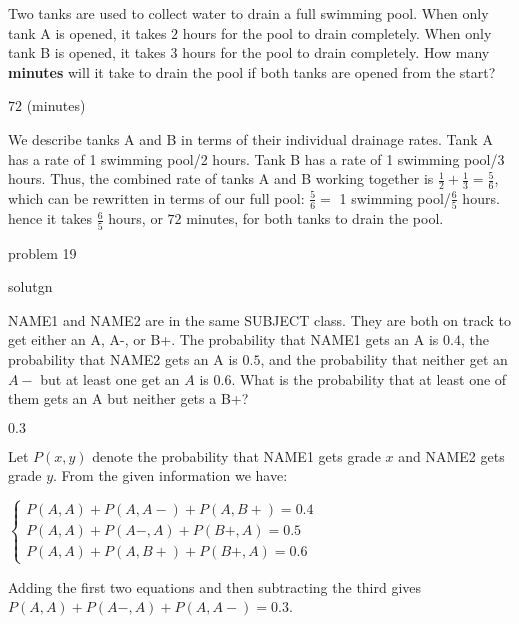 \documentclass[11pt]{article}
\begin{document}
\begin{problem}%
Two tanks are used to collect water to drain a full swimming pool. When only tank A is opened, it takes $2$ hours for the pool to drain completely. When only tank B is opened, it takes $3$ hours for the pool to drain completely. How many \textbf{minutes} will it take to drain the pool if both tanks are opened from the start?
\end{problem}

\begin{answer}
$\boxed{72}$ (minutes)
\end{answer}

\begin{solution}
We describe tanks A and B in terms of their individual drainage rates. Tank A has a rate of 1 swimming pool/2 hours. Tank B has a rate of 1 swimming pool/3 hours. Thus, the combined rate of tanks A and B working together is $\frac{1}{2} + \frac{1}{3} = \frac{5}{6}$, which can be rewritten in terms of our full pool: $\frac{5}{6} =$ 1 swimming pool/$\frac{6}{5}$ hours. hence it takes $\frac{6}{5}$ hours, or $\boxed{72}$ minutes, for both tanks to drain the pool.
\end{solution}


\begin{problem}
problem 19
\end{problem}

\begin{answer}

\end{answer}

\begin{solution}
solutgn
\end{solution}


\begin{problem}
NAME1 and NAME2 are in the same SUBJECT class. They are both on track to get either an A, A-, or B+. The probability that NAME1 gets an A is $0.4$, the probability that NAME2 gets an A is $0.5$, and the probability that neither get an $A-$ but at least one get an $A$ is $0.6$. What is the probability that at least one of them gets an A but neither gets a B+?
\end{problem}

\begin{answer}
$\boxed{0.3}$
\end{answer}

\begin{solution}
Let $P(x, y)$ denote the probability that NAME1 gets grade $x$ and NAME2 gets grade $y$. From the given information we have: \begin{center}$\begin{cases} P(A, A) + P(A, A-) + P(A, B+) = 0.4 \\ P(A, A) + P(A-, A) + P(B+, A) = 0.5 \\ P(A, A) + P(A, B+) + P(B+, A) = 0.6\end{cases}$\end{center} Adding the first two equations and then subtracting the third gives $P(A, A) + P(A-, A) + P(A, A-) = \boxed{0.3}$.
\end{solution}
\end{document}

